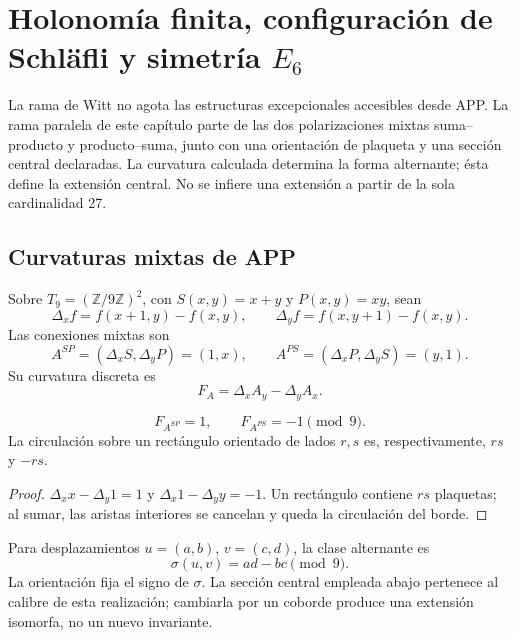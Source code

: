 \section{Holonomía finita, configuración de Schläfli y simetría \texorpdfstring{\(E_6\)}{E6}}
\label{p12-83-c20-s6:chap:holonomia-schlafli-e6-nuevo}

La rama de Witt no agota las estructuras excepcionales accesibles desde
APP. La rama paralela de este capítulo parte de las dos polarizaciones
mixtas suma--producto y producto--suma, junto con una orientación de
plaqueta y una sección central declaradas. La curvatura calculada determina
la forma alternante; ésta define la extensión central. No se infiere una
extensión a partir de la sola cardinalidad 27.

\subsection{Curvaturas mixtas de APP}

Sobre \(T_9=(\mathbb Z/9\mathbb Z)^2\), con
\(S(x,y)=x+y\) y \(P(x,y)=xy\), sean
\[
 \Delta_xf=f(x+1,y)-f(x,y),\qquad
 \Delta_yf=f(x,y+1)-f(x,y).
\]
Las conexiones mixtas son
\[
 A^{SP}=(\Delta_xS,\Delta_yP)=(1,x),\qquad
 A^{PS}=(\Delta_xP,\Delta_yS)=(y,1).
\]
Su curvatura discreta es
\[
 F_A=\Delta_xA_y-\Delta_yA_x.
\]

\begin{proposition}
\label{p12-83-c20-s6:prop:curvaturas-app-e6-nuevo}
\[
 F_{A^{SP}}=1,\qquad F_{A^{PS}}=-1\pmod9.
\]
La circulación sobre un rectángulo orientado de lados \(r,s\) es,
respectivamente, \(rs\) y \(-rs\).
\end{proposition}

\begin{proof}
\(\Delta_xx-\Delta_y1=1\) y
\(\Delta_x1-\Delta_yy=-1\). Un rectángulo contiene \(rs\) plaquetas; al
sumar, las aristas interiores se cancelan y queda la circulación del borde.
\end{proof}

Para desplazamientos \(u=(a,b)\), \(v=(c,d)\), la clase alternante es
\begin{equation}
 \sigma(u,v)=ad-bc\pmod9.
 \label{p12-83-c20-s6:eq:forma-alternante-e6-nueva}
\end{equation}
La orientación fija el signo de \(\sigma\). La sección central empleada
abajo pertenece al calibre de esta realización; cambiarla por un coborde
produce una extensión isomorfa, no un nuevo invariante.

